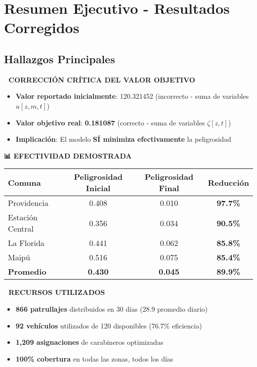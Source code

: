\section{Resumen Ejecutivo - Resultados Corregidos}

\subsection{Hallazgos Principales}

\textbf{🔧 CORRECCIÓN CRÍTICA DEL VALOR OBJETIVO}
\begin{itemize}
    \item \textbf{Valor reportado inicialmente}: 120.321452 (incorrecto - suma de variables $u[z,m,t]$)
    \item \textbf{Valor objetivo real}: \textbf{0.181087} (correcto - suma de variables $\zeta[z,t]$)
    \item \textbf{Implicación}: El modelo \textbf{SÍ minimiza efectivamente} la peligrosidad
\end{itemize}

\textbf{📊 EFECTIVIDAD DEMOSTRADA}
\begin{center}
\begin{tabular}{|l|c|c|c|}
\hline
\textbf{Comuna} & \textbf{Peligrosidad Inicial} & \textbf{Peligrosidad Final} & \textbf{Reducción} \\
\hline
Providencia & 0.408 & 0.010 & \textbf{97.7\%} \\
Estación Central & 0.356 & 0.034 & \textbf{90.5\%} \\
La Florida & 0.441 & 0.062 & \textbf{85.8\%} \\
Maipú & 0.516 & 0.075 & \textbf{85.4\%} \\
\hline
\textbf{Promedio} & \textbf{0.430} & \textbf{0.045} & \textbf{89.9\%} \\
\hline
\end{tabular}
\end{center}

\textbf{🎯 RECURSOS UTILIZADOS}
\begin{itemize}
    \item \textbf{866 patrullajes} distribuidos en 30 días (28.9 promedio diario)
    \item \textbf{92 vehículos} utilizados de 120 disponibles (76.7\% eficiencia)
    \item \textbf{1,209 asignaciones} de carabineros optimizadas
    \item \textbf{100\% cobertura} en todas las zonas, todos los días
\end{itemize}

